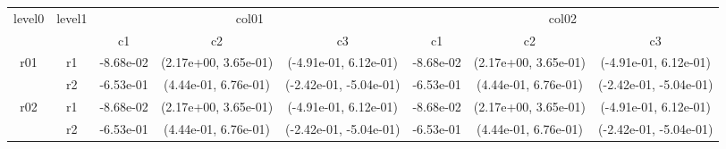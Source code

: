 \begin{tabular}{cccccccc}
\toprule
\multirow{2}{*}{level0} & \multirow{2}{*}{level1}&\multicolumn{3}{c}{col01}&\multicolumn{3}{c}{col02}\tabularnewline
\cmidrule(lr){3-5}
\cmidrule(lr){6-8}
&&c1&c2&c3&c1&c2&c3\tabularnewline
\midrule
\midrule
\multirow{2}{*}{r01}&r1&-8.68e-02& (2.17e+00, 3.65e-01)& (-4.91e-01, 6.12e-01)&-8.68e-02& (2.17e+00, 3.65e-01)& (-4.91e-01, 6.12e-01)\tabularnewline
&r2&-6.53e-01& (4.44e-01, 6.76e-01)& (-2.42e-01, -5.04e-01)&-6.53e-01& (4.44e-01, 6.76e-01)& (-2.42e-01, -5.04e-01)\tabularnewline
\midrule
\multirow{2}{*}{r02}&r1&-8.68e-02& (2.17e+00, 3.65e-01)& (-4.91e-01, 6.12e-01)&-8.68e-02& (2.17e+00, 3.65e-01)& (-4.91e-01, 6.12e-01)\tabularnewline
&r2&-6.53e-01& (4.44e-01, 6.76e-01)& (-2.42e-01, -5.04e-01)&-6.53e-01& (4.44e-01, 6.76e-01)& (-2.42e-01, -5.04e-01)\tabularnewline
\bottomrule
\end{tabular}
